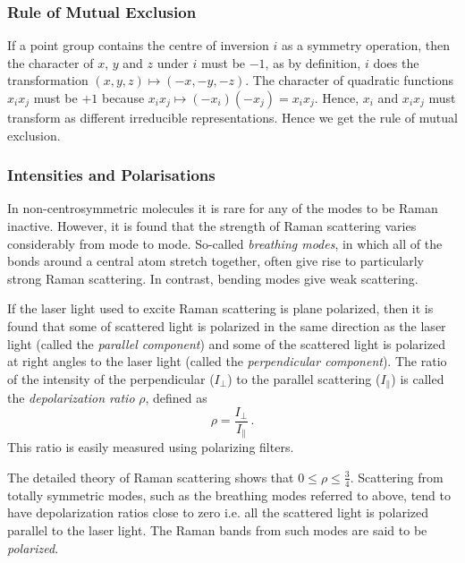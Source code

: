 \documentclass{article}
\theoremstyle{plain}\theoremheaderfont{\normalfont\itshape}\theorembodyfont{\rmfamily}\theoremseparator{.}\newtheorem*{rem}{Remark}\newtheorem*{ex}{Example}\newtheorem*{proof}{Proof}\newtheorem*{altp}{Alternative proof}
\theoremstyle{plain}\theoremheaderfont{\normalfont\bfseries}\theorembodyfont{\rmfamily}\theoremseparator{.}\newtheorem{thm}{Theorem}[section]\newtheorem{lem}[thm]{Lemma}\newtheorem{prop}[thm]{Proposition}\newtheorem*{cor}{Corollary}\newtheorem{defn}[thm]{Definition}\newtheorem{clm}[thm]{Claim}\newtheorem{clminproof}{Claim}\newtheorem{pos}{Postulate}[section]
\theoremstyle{break}\theoremheaderfont{\normalfont\itshape}\theorembodyfont{\rmfamily}\theoremseparator{.\medskip}\newtheorem*{proofskip}{Proof}\newtheorem*{exs}{Examples}\newtheorem*{rems}{Remarks}
\theoremstyle{break}\theoremheaderfont{\normalfont\bfseries}\theorembodyfont{\rmfamily}\theoremseparator{.\medskip}\newtheorem{lemskip}[thm]{Lemma}\newtheorem{defnskip}[thm]{Definition}\newtheorem{propskip}[thm]{Proposition}\newtheorem{thmskip}[thm]{Theorem}
\numberwithin{equation}{section}
\begin{document}
    \subsubsection*{Rule of Mutual Exclusion}
    If a point group contains the centre of inversion \(i\) as a symmetry operation, then the character of \(x\), \(y\) and \(z\) under \(i\) must be \(-1\), as by definition, \(i\) does the transformation \((x,y,z)\mapsto(-x,-y,-z)\). The character of quadratic functions \(x_ix_j\) must be \(+1\) because \(x_ix_j\mapsto(-x_i)(-x_j)=x_ix_j\). Hence, \(x_i\) and \(x_i x_j\) must transform as different irreducible representations. Hence we get the rule of mutual exclusion.


    \subsubsection{Intensities and Polarisations}
    In non-centrosymmetric molecules it is rare for any of the modes to be Raman inactive. However, it is found that the strength of Raman scattering varies considerably from mode to mode. So-called \textit{breathing modes}, in which all of the bonds around a central atom stretch together, often give rise  to particularly strong Raman scattering. In contrast, bending modes give weak scattering.

    If the laser light used to excite Raman scattering is plane polarized, then it is found that some of scattered light is polarized in the same direction as the laser light (called the \textit{parallel component}) and some of the scattered light is polarized at right angles to the laser light (called the \textit{perpendicular component}). The ratio of the intensity of the perpendicular (\(I_\perp\)) to the parallel scattering (\(I_\parallel\)) is called the \textit{depolarization ratio} \(\rho\), defined as
    \begin{equation}
        \rho=\frac{I_\perp}{I_\parallel}\,.
    \end{equation}
    This ratio is easily measured using polarizing filters.

    The detailed theory of Raman scattering shows that \(0\le\rho\le\frac{3}{4}\). Scattering from totally symmetric modes, such as the breathing modes referred to above, tend to have depolarization ratios close to zero i.e. all the scattered light is polarized parallel to the laser light. The Raman bands from such modes are said to be \textit{polarized}.
\end{document}
